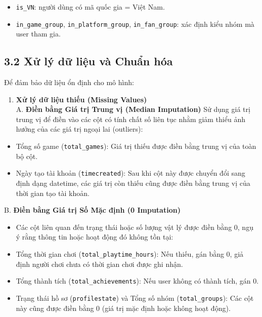 \documentclass[
  11pt,
]{article}
\providecommand{\tightlist}{%
  \setlength{\itemsep}{0pt}\setlength{\parskip}{0pt}}
\begin{document}
\begin{itemize}
  \begin{itemize}
  \tightlist
  \item
    \texttt{is\_VN}: người dùng có mã quốc gia = Việt Nam.\\
  \item
    \texttt{in\_game\_group}, \texttt{in\_platform\_group},
    \texttt{in\_fan\_group}: xác định kiểu nhóm mà user tham gia.
  \end{itemize}
\end{itemize}

\hypertarget{xux1eed-luxfd-dux1eef-liux1ec7u-vuxe0-chuux1ea9n-huxf3a}{%
\subsection{3.2 Xử lý dữ liệu và Chuẩn
hóa}\label{xux1eed-luxfd-dux1eef-liux1ec7u-vuxe0-chuux1ea9n-huxf3a}}

Để đảm bảo dữ liệu ổn định cho mô hình:

\begin{enumerate}
\def\labelenumi{\arabic{enumi}.}
\tightlist
\item
  \textbf{Xử lý dữ liệu thiếu (Missing Values)}\\
  A. \textbf{Điền bằng Giá trị Trung vị (Median Imputation)} Sử dụng giá
  trị trung vị để điền vào các cột có tính chất số liên tục nhằm giảm
  thiểu ảnh hưởng của các giá trị ngoại lai (outliers):
\end{enumerate}

\begin{itemize}
\item
  Tổng số game (\texttt{total\_games}): Giá trị thiếu được điền bằng
  trung vị của toàn bộ cột.
\item
  Ngày tạo tài khoản (\texttt{timecreated}): Sau khi cột này được chuyển
  đổi sang định dạng datetime, các giá trị còn thiếu cũng được điền bằng
  trung vị của thời gian tạo tài khoản.
\end{itemize}

B. \textbf{Điền bằng Giá trị Số Mặc định (0 Imputation)}

\begin{itemize}
\item
  Các cột liên quan đến trạng thái hoặc số lượng vật lý được điền bằng
  0, ngụ ý rằng thông tin hoặc hoạt động đó không tồn tại:
\item
  Tổng thời gian chơi (\texttt{total\_playtime\_hours}): Nếu thiếu, gán
  bằng 0, giả định người chơi chưa có thời gian chơi được ghi nhận.
\item
  Tổng thành tích (\texttt{total\_achievements}): Nếu user không có
  thành tích, gán 0.
\item
  Trạng thái hồ sơ (\texttt{profilestate}) và Tổng số nhóm
  (\texttt{total\_groups}): Các cột này cũng được điền bằng 0 (giá trị
  mặc định hoặc không hoạt động).
\end{itemize}
\end{document}

